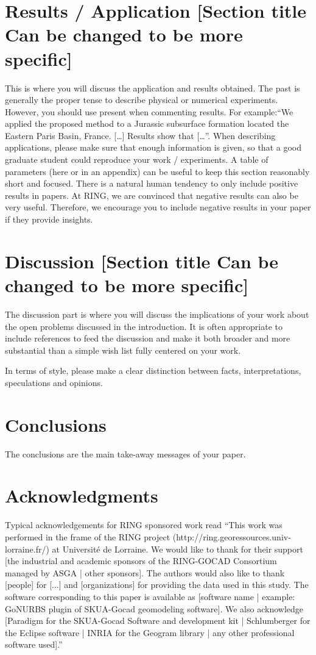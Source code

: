 \documentclass[final]{ring}
\begin{document}
\section{Results / Application [Section title Can be changed to be more specific]}
\label{sec:appli}

This is where you will discuss the application and results obtained. The past is generally the proper tense to describe physical or numerical experiments. However, you should use present when commenting results. For example:``We applied the proposed method to a Jurassic subsurface formation located the Eastern Paris Basin, France. […] Results show that […''.
When describing applications, please make sure that enough information is given, so that a good graduate student could reproduce your work / experiments. A table of parameters (here or in an appendix) can be useful to keep this section reasonably short and focused.
There is a natural human tendency to only include positive results in papers. At RING, we are convinced that negative results can also be very useful. Therefore, we encourage you to include negative results in your paper if they provide insights. 


\section{Discussion [Section title Can be changed to be more specific]}
\label{sec:discussion}

The discussion part is where you will discuss the implications of your work about the open problems discussed in the introduction. It is often appropriate to include references to feed the discussion and make it both broader and more substantial than a simple wish list fully centered on your work. 

In terms of style, please make a clear distinction between facts, interpretations, speculations and opinions. 

\section*{Conclusions}

The conclusions are the main take-away messages of your paper. 

\section*{Acknowledgments}

Typical acknowledgements for RING sponsored work read ``This work was performed in the frame of the RING project (http://ring.georessources.univ-lorraine.fr/) at Université de Lorraine. We would like to thank for their support [the industrial and academic sponsors of the RING-GOCAD Consortium managed by ASGA | other sponsors]. The authors would also like to thank [people] for [...] and [organizations] for providing the data used in this study. The software corresponding to this paper is available as [software name | example: GoNURBS plugin of SKUA-Gocad geomodeling software]. We also acknowledge [Paradigm for the SKUA-Gocad Software and development kit | Schlumberger for the Eclipse software | INRIA for the Geogram library | any other professional software used].''


\end{document}

